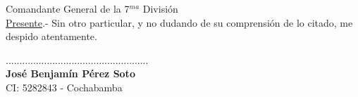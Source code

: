 \documentclass[a4paper,10pt]{letter}
\begin{document}
\begin{letter}{Comandante General de la 7$^{ma}$ Divisi\'on \\ \underline{Presente}.-}
Sin otro particular, y no dudando de su comprensi\'on de lo citado, me despido atentamente.\\

\vspace{3cm}


\signature{\\$$TITLE$$}
\begin{center}
....................................................\\
{\bfseries Jos\'e Benjam\'in P\'erez Soto}\\
CI: 5282843 - Cochabamba
\end{center}





\end{letter}
\end{document}
